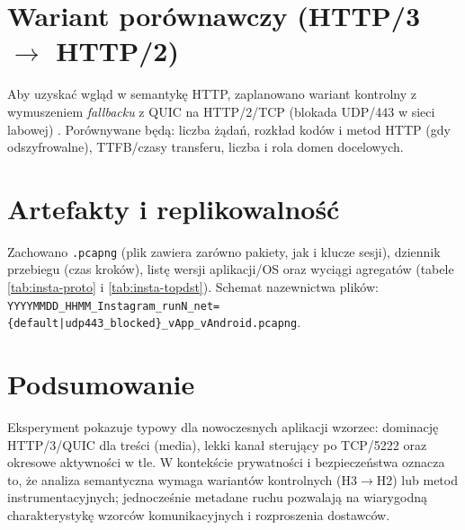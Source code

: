 \section{Wariant porównawczy (HTTP/3 $\rightarrow$ HTTP/2)}
Aby uzyskać wgląd w semantykę HTTP, zaplanowano wariant kontrolny z wymuszeniem \emph{fallbacku} z QUIC na HTTP/2/TCP (blokada UDP/443 w sieci labowej) \cite{RFC9114}. Porównywane będą: liczba żądań, rozkład kodów i metod HTTP (gdy odszyfrowalne), TTFB/czasy transferu, liczba i rola domen docelowych.

\section{Artefakty i replikowalność}
Zachowano \texttt{.pcapng} (plik zawiera zarówno pakiety, jak i klucze sesji), dziennik przebiegu (czas kroków), listę wersji aplikacji/OS oraz wyciągi agregatów (tabele \ref{tab:insta-proto} i \ref{tab:insta-topdst}). Schemat nazewnictwa plików: \texttt{YYYYMMDD\_HHMM\_Instagram\_runN\_net=\{default|udp443\_blocked\}\_vApp\_vAndroid.pcapng}.

\section{Podsumowanie}
Eksperyment pokazuje typowy dla nowoczesnych aplikacji wzorzec: dominację HTTP/3/QUIC dla treści (media), lekki kanał sterujący po TCP/5222 oraz okresowe aktywności w tle. W kontekście prywatności i bezpieczeństwa oznacza to, że analiza semantyczna wymaga wariantów kontrolnych (H3$\rightarrow$H2) lub metod instrumentacyjnych; jednocześnie metadane ruchu pozwalają na wiarygodną charakterystykę wzorców komunikacyjnych i rozproszenia dostawców.
